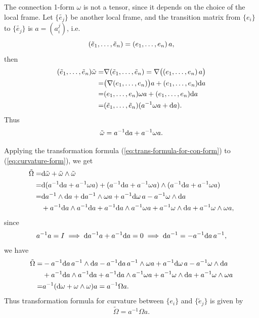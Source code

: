 The connection 1-form $\omega$ is not a tensor, since it depends on the choice of the local frame.
Let $\{\tilde{e_j}\}$ be another local frame, and the transition matrix 
from $\{e_i\}$ to $\{\tilde{e_j}\}$ is $a=(a_i^j)$, i.e. 
\begin{equation*}
    ({\tilde{e}}_{1},\dots,{\tilde{e}}_{n}) = ({e}_{1},\dots,{e}_{n})\, a, 
\end{equation*}
then 
\begin{align*}
    ({\tilde{e}}_{1},\dots,{\tilde{e}}_{n})\tilde{\omega} =& \nabla({\tilde{e}}_{1},\dots,{\tilde{e}}_{n}) 
    = \nabla\big(({e}_{1},\dots,{e}_{n})\, a\big) \\
    =& \big(\nabla({e}_{1},\dots,{e}_{n})\big) a + ({e}_{1},\dots,{e}_{n}) {\rm d} a \\
    =& ({e}_{1},\dots,{e}_{n}) \omega a + ({e}_{1},\dots,{e}_{n}) {\rm d} a \\
    =& ({\tilde{e}}_{1},\dots,{\tilde{e}}_{n}) (a^{-1} \omega a + {\rm d} a).
\end{align*}
Thus 
\begin{equation}\label{eq:trans-formula-for-con-form}
    \tilde{\omega} = a^{-1} {\rm d} a + a^{-1} \omega a.
\end{equation}

Applying the transformation formula (\ref{eq:trans-formula-for-con-form}) to (\ref{eq:curvature-form}), we get 
\begin{align*}
    \tilde{\Omega} =& {\rm d}\tilde{\omega} + \tilde{\omega}\wedge \tilde{\omega} \\
    =& {\rm d}(a^{-1} {\rm d} a + a^{-1} \omega a) + (a^{-1} {\rm d} a + a^{-1} \omega a)\wedge (a^{-1} {\rm d} a + a^{-1} \omega a) \\
    =& {\rm d} a^{-1} \wedge {\rm d} a + {\rm d} a^{-1} \wedge \omega a + a^{-1} {\rm d}\omega\, a - a^{-1} \omega \wedge {\rm d} a \\
    &+ a^{-1} {\rm d} a \wedge a^{-1} {\rm d} a + a^{-1} {\rm d} a \wedge a^{-1} \omega a 
    + a^{-1} \omega \wedge {\rm d} a + a^{-1} \omega \wedge \omega a, \\
\end{align*}
since
\begin{equation*}
    a^{-1}a = I \implies {\rm d} a^{-1} a + a^{-1} {\rm d} a = 0 \implies {\rm d} a^{-1} = -a^{-1} {\rm d} a\, a^{-1},
\end{equation*}
we have
\begin{align*}
    \tilde{\Omega} =& -a^{-1} {\rm d} a\, a^{-1} \wedge {\rm d} a - a^{-1} {\rm d} a\, a^{-1} \wedge \omega a + a^{-1} {\rm d}\omega\, a - a^{-1} \omega \wedge {\rm d} a \\
    &+ a^{-1} {\rm d} a \wedge a^{-1} {\rm d} a + a^{-1} {\rm d} a \wedge a^{-1} \omega a + a^{-1} \omega \wedge {\rm d} a + a^{-1} \omega \wedge \omega a \\
    =& a^{-1} ({\rm d}\omega + \omega\wedge\omega) a = a^{-1} \Omega a.
\end{align*}
Thus transformation formula for curvature between $\{e_i\}$ and $\{\tilde{e}_j\}$ is given by
\begin{equation}\label{eq:trans-formula-for-curvature}
    \tilde{\Omega} = a^{-1} \Omega a.
\end{equation}

